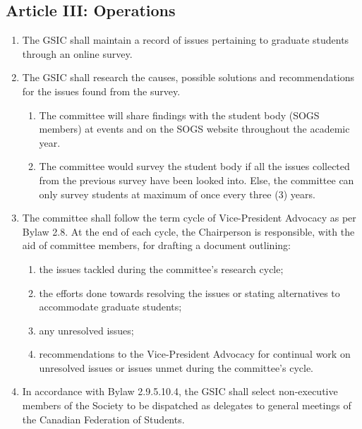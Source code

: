 \subsection{Article III: Operations}
\begin{enumerate}[label*=\arabic*., align=left]
\item The GSIC shall maintain a record of issues pertaining to graduate students through an online survey.
\item The GSIC shall research the causes, possible solutions and recommendations for the issues found from the survey.
\begin{enumerate}[label*=\arabic*., align=left]
\item The committee will share findings with the student body (SOGS members) at events and on the SOGS website throughout the academic year. 
\item The committee would survey the student body if all the issues collected from the previous survey have been looked into. Else, the committee can only survey students at maximum of once every three (3) years. 
\end{enumerate}
\item The committee shall follow the term cycle of Vice-President Advocacy as per Bylaw 2.8. At the end of each cycle, the Chairperson is responsible, with the aid of committee members, for drafting a document outlining: 
\begin{enumerate}[label*=\arabic*., align=left]
\item the issues tackled during the committee’s research cycle;
\item the efforts done towards resolving the issues or stating alternatives to accommodate graduate students;
\item any unresolved issues;
\item recommendations to the Vice-President Advocacy for continual work on unresolved issues or issues unmet during the committee’s cycle.
\end{enumerate}
\item In accordance with Bylaw 2.9.5.10.4, the GSIC shall select non-executive members of the Society to be dispatched as delegates to general meetings of the Canadian Federation of Students.
\end{enumerate}